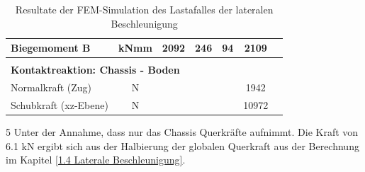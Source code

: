 \begin{table}[H]
\begin{threeparttable}
\begin{tabular}{lcccccc}
  Biegemoment B	&	kNmm	&	2092	&	246	&	94	&	2109	&		\\	\hline	\\
  \multicolumn{5}{l}{\textbf{Kontaktreaktion: Chassis - Boden}}									&		&		\\	\thickhline
  Normalkraft (Zug)	&	N	&		&		&		&	1942	&		\\
  Schubkraft (xz-Ebene)	&	N	&		&		&		&	10972	&		\\	\hline
  \end{tabular}
  \begin{tablenotes}
      \item[5] Unter der Annahme, dass nur das Chassis Querkräfte aufnimmt. Die Kraft von 6.1 kN ergibt sich aus der Halbierung der globalen Querkraft aus der Berechnung im Kapitel \ref{1.4 Laterale Beschleunigung}.
  \end{tablenotes}
\end{threeparttable}
  \caption{Resultate der FEM-Simulation des Lastafalles der lateralen Beschleunigung}
  \label{tab:FEM 1.4}
  \end{table}




